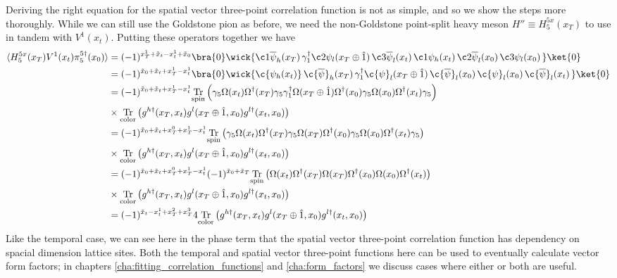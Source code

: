Deriving the right equation for the spatial vector three-point correlation function is not as simple, and so we show the steps more thoroughly.  While we can still use the Goldstone pion as before, we need the non-Goldstone point-split heavy meson $H'' \equiv H^{5x}_{5}(x_T)$ to use in tandem with $V^1(x_t)$.  Putting these operators together we have
\begin{equation}\label{eq:xvector_3ptderive}
\begin{split}
    \langle H^{5x}_{5}(x_T)V^{1}(x_t)\pi^{5\dagger}_5(x_0)\rangle &= 
    (-1)^{x^1_T+\tilde{x}_t -x^1_t+\tilde{x}_0}   
    \bra{0} \wick{
    \c1{\overline{\psi}}_h(x_T)\,\gamma_1^\dagger \c2{\psi}_l(x_T \oplus \hat{1})\,
    \c3{\overline{\psi}}_l(x_t)\, \c1{\psi_h(x_t)}\,
    \c2{\overline{\psi}}_l(x_0) \, \c3{\psi}_l(x_0)\,}
    \ket{0}\\
    &= (-1)^{\tilde{x}_0+\tilde{x}_t+x^1_T -x^1_t}   
    \bra{0} \wick{
    \c{\psi_h(x_t)}\, \c{\overline{\psi}}_h(x_T)\,
    {\gamma_1^\dagger}\c{\psi}_l(x_T \oplus \hat{1})\, \c{\overline{\psi}}_l(x_0) \,
    \c{\psi}_l(x_0)\, \c{\overline{\psi}}_l(x_t)\,
    }\ket{0}\\
    &= (-1)^{\tilde{x}_0+\tilde{x}_t+x^1_T -x^1_t}\underset{\mathrm{spin}}{\mathrm{Tr}}\left(\gamma_5\Omega(x_t)\Omega^\dagger(x_T)\gamma_5\gamma_1^\dagger\Omega(x_T\oplus\hat1)\Omega^\dagger(x_0)\gamma_5\Omega(x_0)\Omega^\dagger(x_t)\gamma_5 \right)\\
    &\times \underset{\mathrm{color}}{\mathrm{Tr}} \left( g^{h\dagger}(x_T,x_t)g^l(x_T\oplus\hat1,x_0)g^{l\dagger}(x_t,x_0) \right)\\
    &= (-1)^{\tilde{x}_0+\tilde{x}_t+x^0_T+x^1_T -x^1_t}\underset{\mathrm{spin}}{\mathrm{Tr}}\left(\gamma_5\Omega(x_t)\Omega^\dagger(x_T)\gamma_5\Omega(x_T)\Omega^\dagger(x_0)\gamma_5\Omega(x_0)\Omega^\dagger(x_t)\gamma_5 \right)\\
    &\times \underset{\mathrm{color}}{\mathrm{Tr}} \left( g^{h\dagger}(x_T,x_t)g^l(x_T\oplus\hat1,x_0)g^{l\dagger}(x_t,x_0) \right)\\
    &= (-1)^{\tilde{x}_0+\tilde{x}_t+x^0_T+x^1_T -x^1_t}(-1)^{\tilde{x}_0+\tilde{x}_T}\underset{\mathrm{spin}}{\mathrm{Tr}}\left(\Omega(x_t)\Omega^\dagger(x_T)\Omega(x_T)\Omega^\dagger(x_0)\Omega(x_0)\Omega^\dagger(x_t) \right)\\
    &\times \underset{\mathrm{color}}{\mathrm{Tr}} \left( g^{h\dagger}(x_T,x_t)g^l(x_T\oplus\hat1,x_0)g^{l\dagger}(x_t,x_0) \right)\\
    &= (-1)^{\tilde{x}_t - x^1_t + x^2_T + x^3_T}4
    \underset{\mathrm{color}}{\mathrm{Tr}} \left( g^{h\dagger}(x_T,x_t)g^l(x_T\oplus\hat1,x_0)g^{l\dagger}(x_t,x_0) \right)
\end{split}
\end{equation}
Like the temporal case, we can see here in the phase term that the spatial vector three-point correlation function has dependency on spacial dimension lattice sites.  Both the temporal and spatial vector three-point functions here can be used to eventually calculate vector form factors; in chapters \ref{cha:fitting_correlation_functions} and \ref{cha:form_factors} we discuss cases where either or both are useful.

